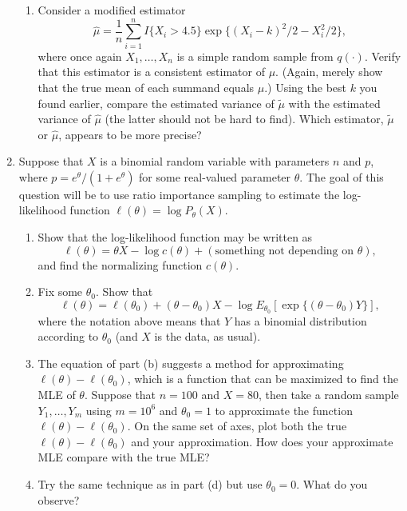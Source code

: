 \documentclass{article}
\begin{document}
\begin{enumerate}
\begin{enumerate}
      \item Consider a modified estimator 
      \[
      \hat\mu = \frac1n \sum_{i=1}^n I\{X_i>4.5\} \exp\{ (X_i-k)^2/2-X_i^2/2 \},
      \]
      where once again $X_1, \ldots, X_n$ is a simple random sample from
      $q(\cdot)$. Verify that this estimator is a consistent estimator of $\mu$.
      (Again, merely show that the true mean of each summand equals $\mu$.)
      Using the best $k$ you found earlier, compare the estimated variance of
      $\tilde\mu$ with the estimated variance of $\hat\mu$ (the latter should
      not be hard to find). Which estimator, $\tilde\mu$ or $\hat\mu$, appears
      to be more precise?
      
    \end{enumerate}

  \item Suppose that $X$ is a binomial random variable with parameters $n$ and
  $p$, where $p=e^\theta/(1+e^\theta)$ for some real-valued parameter $\theta$.
  The goal of this question will be to use ratio importance sampling to estimate
  the log-likelihood function $\ell(\theta) = \log P_\theta(X)$.
  
    \begin{enumerate}
    
      \item Show that the log-likelihood function may be written as
      \[
      \ell(\theta) = \theta X - \log c(\theta) + (\mbox{something not depending
      on $\theta$}),
      \] 
      and find the normalizing function $c(\theta)$.
      
      \item Fix some $\theta_0$.  Show that 
      \[
      \ell(\theta) = \ell(\theta_0) + (\theta-\theta_0)X - \log E_{\theta_0} [
      \exp\{ (\theta-\theta_0)Y  \} ],
      \]
      where the notation above means that $Y$ has a binomial distribution
      according to $\theta_0$ (and $X$ is the data, as usual).
      
      \item The equation of part (b) suggests a method for approximating
      $\ell(\theta)-\ell(\theta_0)$, which is a function that can be maximized
      to find the MLE of $\theta$. Suppose that $n=100$ and $X=80$, then take a
      random sample $Y_1, \ldots, Y_m$ using $m=10^6$ and $\theta_0=1$ to
      approximate the function $\ell(\theta)-\ell(\theta_0)$. On the same set of
      axes, plot both the true $\ell(\theta)-\ell(\theta_0)$ and your
      approximation. How does your approximate MLE compare with the true MLE?
      
      \item Try the same technique as in part (d) but use $\theta_0=0$. What do
      you observe?
      
    \end{enumerate}

\end{enumerate}
\end{document}
